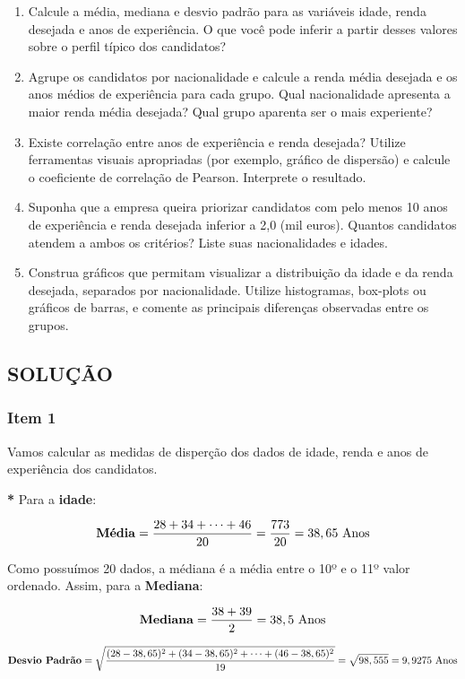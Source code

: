 \documentclass[a4paper,11pt]{article}
\begin{document}
\begin{enumerate} 
\item Calcule a média, mediana e desvio padrão para as variáveis idade, renda desejada e anos de experiência. O que você pode inferir a partir desses valores sobre o perfil típico dos candidatos?
\item Agrupe os candidatos por nacionalidade e calcule a renda média desejada e os anos médios de experiência para cada grupo. Qual nacionalidade apresenta a maior renda média desejada? Qual grupo aparenta ser o mais experiente?
\item Existe correlação entre anos de experiência e renda desejada? Utilize ferramentas visuais apropriadas (por exemplo, gráfico de dispersão) e calcule o coeficiente de correlação de Pearson. Interprete o resultado. 
\item Suponha que a empresa queira priorizar candidatos com pelo menos 10 anos de experiência e renda desejada inferior a 2,0 (mil euros). Quantos candidatos atendem a ambos os critérios? Liste suas nacionalidades e idades.
\item Construa gráficos que permitam visualizar a distribuição da idade e da renda desejada, separados por nacionalidade. Utilize histogramas, box-plots ou gráficos de barras, e comente as principais diferenças observadas entre os grupos.
\end{enumerate}

\subsection{\textbf{SOLUÇÃO}}

\subsubsection{Item 1}

Vamos calcular as medidas de disperção dos dados de idade, renda e anos de experiência dos candidatos.

\textbf{*} Para a \textbf{idade}:

\[
\text{\textbf{Média}} =  \frac{28 + 34 + \cdots + 46}{20} =  \frac{773}{20} = 38,65 \text{ Anos}
\]
    
Como possuímos 20 dados, a médiana é a média entre o 10º e o 11º valor ordenado. Assim, para a \textbf{Mediana}:

\[
\text{\textbf{Mediana}} = \frac{38 + 39}{2} = 38,5 \text{ Anos}
\]


\[
\text{\textbf{Desvio Padrão}} = \sqrt{\frac{(28-38,65)^2 + (34-38,65)^2 + \cdots + (46-38,65)^2}{19}} = \sqrt{98,555} = 9,9275 \text{ Anos}
\]
\end{document}

